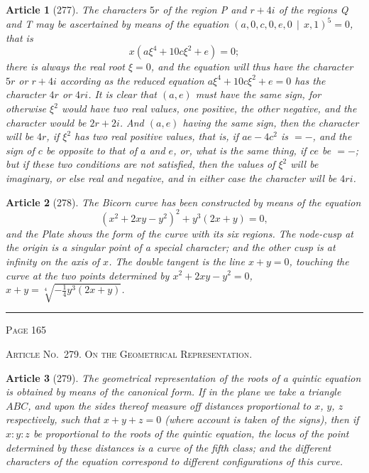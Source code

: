\documentclass[11pt,a4paper]{article}
\theoremstyle{cayley}
\newtheorem{art}{Article}
\begin{document}
\begin{art}[277]
The characters $5r$ of the region P and $r+4i$ of the regions Q and T may be ascertained by means of the equation $(a, 0, c, 0, e, 0 \,\mid\, x, 1)^5 = 0$, that is
\[
x(a\xi^4 + 10c\xi^2 + e) = 0;
\]
there is always the real root $\xi=0$, and the equation will thus have the character $5r$ or $r+4i$ according as the reduced equation $a\xi^4 + 10c\xi^2 + e = 0$ has the character $4r$ or $4ri$. It is clear that $(a, e)$ must have the same sign, for otherwise $\xi^2$ would have two real values, one positive, the other negative, and the character would be $2r+2i$. And $(a, e)$ having the same sign, then the character will be $4r$, if $\xi^2$ has two real positive values, that is, if $ae - 4c^2$ is $=-$, and the sign of $c$ be opposite to that of $a$ and $e$, or, what is the same thing, if $ce$ be $=-$; but if these two conditions are not satisfied, then the values of $\xi^2$ will be imaginary, or else real and negative, and in either case the character will be $4ri$.
\end{art}

\begin{art}[278]
The Bicorn curve has been constructed by means of the equation
\[
(x^2 + 2xy - y^2)^2 + y^3(2x+y) = 0,
\]
and the Plate shows the form of the curve with its six regions. The node-cusp at the origin is a singular point of a special character; and the other cusp is at infinity on the axis of $x$. The double tangent is the line $x+y=0$, touching the curve at the two points determined by $x^2 + 2xy - y^2 = 0$, $x+y = \sqrt[4]{-\frac{1}{4}y^3(2x+y)}$.
\end{art}

\vspace{1em}
\noindent\rule{\textwidth}{0.4pt}
\begin{center}\textsc{Page 165}\end{center}
\newpage

\begin{center}
\textsc{Article No.\ 279. On the Geometrical Representation.}
\end{center}

\begin{art}[279]
The geometrical representation of the roots of a quintic equation is obtained by means of the canonical form. If in the plane we take a triangle $ABC$, and upon the sides thereof measure off distances proportional to $x$, $y$, $z$ respectively, such that $x+y+z=0$ (where account is taken of the signs), then if $x:y:z$ be proportional to the roots of the quintic equation, the locus of the point determined by these distances is a curve of the fifth class; and the different characters of the equation correspond to different configurations of this curve.
\end{art}
\end{document}
